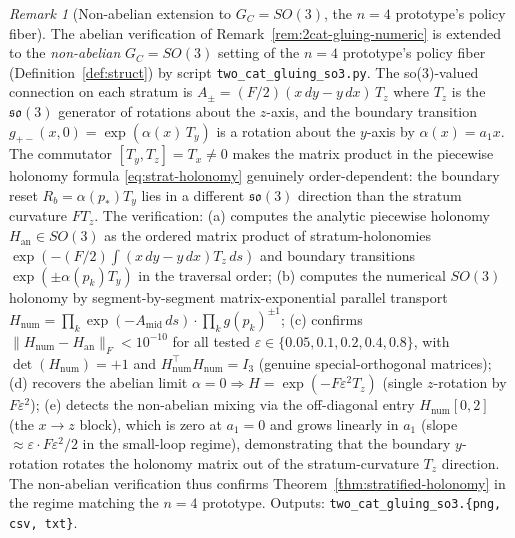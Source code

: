 \documentclass[11pt,a4paper]{article}
\theoremstyle{plain}
\theoremstyle{definition}
\theoremstyle{remark}
\newtheorem{remark}[theorem]{Remark}
\newcommand{\so}{\mathfrak{so}}
\begin{document}
\begin{remark}[Non-abelian extension to $G_C = SO(3)$, the $n=4$
prototype's policy fiber]
\label{rem:2cat-gluing-so3}
The abelian verification of Remark~\ref{rem:2cat-gluing-numeric} is
extended to the \emph{non-abelian} $G_C = SO(3)$ setting of the $n=4$
prototype's policy fiber (Definition~\ref{def:struct}) by script
\texttt{two\_cat\_gluing\_so3.py}. The
so(3)-valued connection on each stratum is $A_\pm = (F/2)(x\,dy - y\,dx)
\,T_z$ where $T_z$ is the $\so(3)$ generator of rotations about the
$z$-axis, and the boundary transition
$g_{+-}(x, 0) = \exp(\alpha(x) \, T_y)$ is a rotation about the
$y$-axis by $\alpha(x) = a_1 x$. The commutator $[T_y, T_z] = T_x \neq
0$ makes the matrix product in the piecewise holonomy formula
\eqref{eq:strat-holonomy} genuinely order-dependent: the boundary reset
$R_b = \alpha(p_*) T_y$ lies in a different $\so(3)$ direction than the
stratum curvature $F T_z$. The verification: (a) computes the analytic
piecewise holonomy $H_{\mathrm{an}} \in SO(3)$ as the ordered matrix
product of stratum-holonomies $\exp(-(F/2) \int (x\,dy - y\,dx) T_z\,ds)$
and boundary transitions $\exp(\pm \alpha(p_k) T_y)$ in the traversal
order; (b) computes the numerical $SO(3)$ holonomy by segment-by-segment
matrix-exponential parallel transport
$H_{\mathrm{num}} = \prod_k \exp(-A_{\mathrm{mid}}\,ds) \cdot \prod_k
g(p_k)^{\pm 1}$; (c) confirms
$\|H_{\mathrm{num}} - H_{\mathrm{an}}\|_F < 10^{-10}$ for all tested
$\varepsilon \in \{0.05, 0.1, 0.2, 0.4, 0.8\}$, with
$\det(H_{\mathrm{num}}) = +1$ and $H_{\mathrm{num}}^\top H_{\mathrm{num}}
= I_3$ (genuine special-orthogonal matrices); (d) recovers the abelian
limit $\alpha = 0 \Rightarrow H = \exp(-F \varepsilon^2 T_z)$ (single
$z$-rotation by $F \varepsilon^2$); (e) detects the non-abelian
mixing via the off-diagonal entry $H_{\mathrm{num}}[0, 2]$ (the
$x \to z$ block), which is zero at $a_1 = 0$ and grows linearly in
$a_1$ (slope $\approx \varepsilon \cdot F \varepsilon^2 / 2$ in the
small-loop regime), demonstrating that the boundary $y$-rotation
rotates the holonomy matrix out of the stratum-curvature $T_z$ direction.
The non-abelian verification thus confirms Theorem~\ref{thm:stratified-holonomy}
in the regime matching the $n=4$ prototype. Outputs:
\texttt{two\_cat\_gluing\_so3.\{png, csv, txt\}}.
\end{remark}
\end{document}
